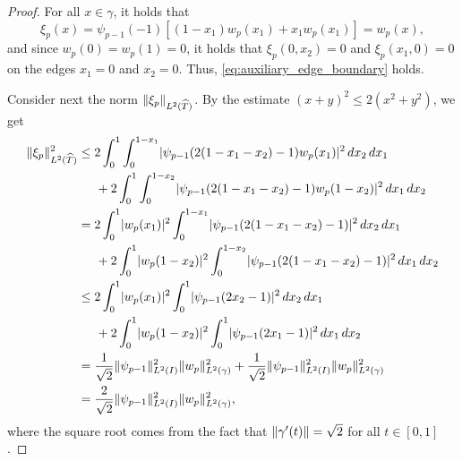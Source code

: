 \documentclass[english, 12pt, a4paper, sci, utf8, a-2b, online]{aaltothesis}
\theoremstyle{definition}
\theoremstyle{plain}
\DeclarePairedDelimiter\abs{\lvert}{\rvert}
\DeclarePairedDelimiter\norm{\lVert}{\rVert}
\newcommand*\diff{\mathop{}\!d}
\numberwithin{equation}{section}
\begin{document}
\begin{proof}
    For all $x \in \gamma$, it holds that
    \begin{equation*}
        \xi_p(x)
        = \psi_{p-1}(-1) [(1-x_1)w_p(x_1) + x_1 w_p(x_1)]
        = w_p(x),
    \end{equation*}
    and since $w_p(0) = w_p(1) = 0$, it holds that
    $\xi_p(0,x_2) = 0$ and $\xi_p(x_1,0) = 0$ on the edges $x_1=0$ and $x_2=0$.
    Thus, \eqref{eq:auxiliary_edge_boundary} holds.

    Consider next the norm $\norm{\xi_p}_{L^2(\widehat{T})}$.
    By the estimate $(x+y)^2 \leq 2(x^2 + y^2)$, we get
    \begin{align}
        \norm{\xi_p}_{L^2(\widehat{T})}^2
        &\leq 2 \int_{0}^{1} \int_{0}^{1-x_1}
            \abs{\psi_{p-1}(2(1-x_1-x_2)-1) w_p(x_1)}^2 \diff x_2 \diff x_1
            \nonumber \\
        &\hspace{5mm} + 2 \int_{0}^{1} \int_{0}^{1-x_2}
            \abs{\psi_{p-1}(2(1-x_1-x_2)-1) w_p(1-x_2)}^2 \diff x_1 \diff x_2
            \nonumber \\
        &= 2 \int_{0}^{1} \abs{w_p(x_1)}^2 \int_{0}^{1-x_1}
            \abs{\psi_{p-1}(2(1-x_1-x_2)-1)}^2 \diff x_2 \diff x_1
            \nonumber \\
        &\hspace{5mm} + 2 \int_{0}^{1} \abs{w_p(1-x_2)}^2 \int_{0}^{1-x_2}
            \abs{\psi_{p-1}(2(1-x_1-x_2)-1)}^2 \diff x_1 \diff x_2 \nonumber \\
        &\leq 2 \int_{0}^{1} \abs{w_p(x_1)}^2 \int_{0}^{1}
            \abs{\psi_{p-1}(2x_2-1)}^2 \diff x_2 \diff x_1 \nonumber \\
        &\hspace{5mm} + 2 \int_{0}^{1} \abs{w_p(1-x_2)}^2 \int_{0}^{1}
            \abs{\psi_{p-1}(2x_1-1)}^2 \diff x_1 \diff x_2 \nonumber \\
        &= \frac{1}{\sqrt{2}}
            \norm{\psi_{p-1}}_{L^2(I)}^2 \norm{w_p}_{L^2(\gamma)}^2
            + \frac{1}{\sqrt{2}} \norm{\psi_{p-1}}_{L^2(I)}^2   
            \norm{w_p}_{L^2(\gamma)}^2 \nonumber \\
        \label{eq:auxiliary_edge_tri_L2}
        &= \frac{2}{\sqrt{2}} \norm{\psi_{p-1}}_{L^2(I)}^2
            \norm{w_p}_{L^2(\gamma)}^2,
    \end{align}
    where the square root comes from the fact that
    $\norm{\gamma'(t)} = \sqrt{2}$ for all $t \in [0,1]$.


\end{proof}
\end{document}
